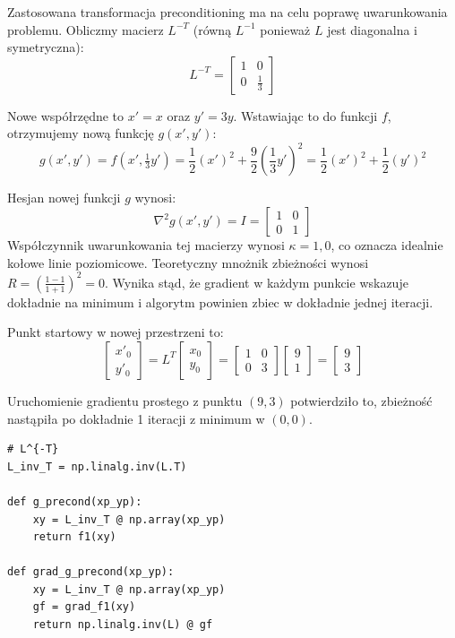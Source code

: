 \documentclass[12pt, a4paper]{article}
\begin{document}
Zastosowana transformacja preconditioning ma na celu poprawę uwarunkowania problemu. Obliczmy macierz $L^{-T}$ (równą $L^{-1}$ ponieważ $L$ jest diagonalna i symetryczna):
\[
  L^{-T} = \begin{bmatrix} 1 & 0 \\ 0 & \frac{1}{3} \end{bmatrix}
\]

Nowe współrzędne to $x' = x$ oraz $y' = 3y$. Wstawiając to do funkcji $f$, otrzymujemy nową funkcję $g(x', y')$:
\[
  g(x', y') = f(x', \tfrac{1}{3}y') = \frac{1}{2}(x')^2 + \frac{9}{2}\left( \frac{1}{3}y' \right)^2 = \frac{1}{2}(x')^2 + \frac{1}{2}(y')^2
\]

Hesjan nowej funkcji $g$ wynosi:
\[
  \nabla^2 g(x', y') = I = \begin{bmatrix} 1 & 0 \\ 0 & 1 \end{bmatrix}
\]
Współczynnik uwarunkowania tej macierzy wynosi $\kappa = 1{,}0$, co oznacza idealnie kołowe linie poziomicowe. Teoretyczny mnożnik zbieżności wynosi $R = \left( \frac{1-1}{1+1} \right)^2 = 0$. Wynika stąd, że gradient w każdym punkcie wskazuje dokładnie na minimum i algorytm powinien zbiec w dokładnie jednej iteracji.

Punkt startowy w nowej przestrzeni to:
\[
  \begin{bmatrix} x'_0 \\ y'_0 \end{bmatrix} = L^T \begin{bmatrix} x_0 \\ y_0 \end{bmatrix} = \begin{bmatrix} 1 & 0 \\ 0 & 3 \end{bmatrix} \begin{bmatrix} 9 \\ 1 \end{bmatrix} = \begin{bmatrix} 9 \\ 3 \end{bmatrix}
\]

Uruchomienie gradientu prostego z punktu $(9, 3)$ potwierdziło to, zbieżność nastąpiła po dokładnie 1 iteracji z minimum w $(0, 0)$.

\begin{lstlisting}[caption={Skalowanie zmiennych (preconditioning)}]
# L^{-T}
L_inv_T = np.linalg.inv(L.T)

def g_precond(xp_yp):
    xy = L_inv_T @ np.array(xp_yp)
    return f1(xy)

def grad_g_precond(xp_yp):
    xy = L_inv_T @ np.array(xp_yp)
    gf = grad_f1(xy)
    return np.linalg.inv(L) @ gf
\end{lstlisting}
\end{document}
